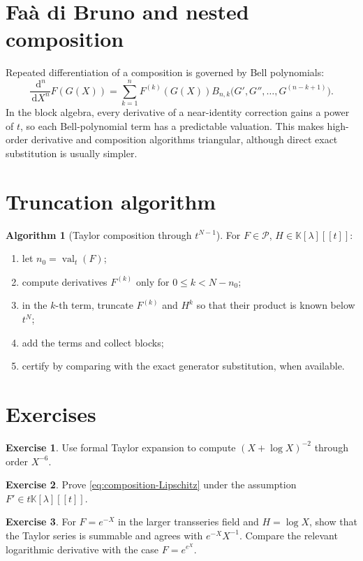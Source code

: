 \documentclass[11pt,openany]{book}
\theoremstyle{definition}
\newtheorem{algorithm}{Algorithm}[chapter]
\newtheorem{exercise}{Exercise}[chapter]
\theoremstyle{plain}
\theoremstyle{remark}
\newcommand{\K}{\mathbb{K}}
\newcommand{\Plog}{\mathscr{P}}
\newcommand{\dd}{\,\mathrm{d}}
\DeclareMathOperator{\val}{val}
\begin{document}
\section{Fa\`a di Bruno and nested composition}
Repeated differentiation of a composition is governed by Bell polynomials:
\begin{equation}\label{eq:faa-di-bruno}
 \frac{\dd^n}{\dd X^n}F(G(X))
 =\sum_{k=1}^{n}F^{(k)}(G(X))
 B_{n,k}\bigl(G',G'',\ldots,G^{(n-k+1)}\bigr).
\end{equation}
In the block algebra, every derivative of a near-identity correction gains a power of \(t\), so each Bell-polynomial term has a predictable valuation. This makes high-order derivative and composition algorithms triangular, although direct exact substitution is usually simpler.

\section{Truncation algorithm}
\begin{algorithm}[Taylor composition through \(t^{N-1}\)]\label{alg:taylor-composition}
For \(F\in\Plog\), \(H\in\K[\lambda][[t]]\):
\begin{enumerate}
\item let \(n_0=\val_t(F)\);
\item compute derivatives \(F^{(k)}\) only for \(0\le k<N-n_0\);
\item in the \(k\)-th term, truncate \(F^{(k)}\) and \(H^k\) so that their product is known below \(t^N\);
\item add the terms and collect blocks;
\item certify by comparing with the exact generator substitution, when available.
\end{enumerate}
\end{algorithm}

\section{Exercises}
\begin{exercise}
Use formal Taylor expansion to compute \((X+\log X)^{-2}\) through order \(X^{-6}\).
\end{exercise}
\begin{exercise}
Prove \cref{eq:composition-Lipschitz} under the assumption \(F'\in t\K[\lambda][[t]]\).
\end{exercise}
\begin{exercise}
For \(F=e^{-X}\) in the larger transseries field and \(H=\log X\), show that the Taylor series is summable and agrees with \(e^{-X}X^{-1}\). Compare the relevant logarithmic derivative with the case \(F=e^{e^X}\).
\end{exercise}
\end{document}
